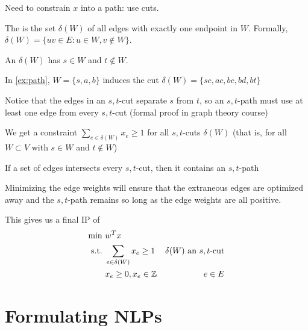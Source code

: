 Need to constrain $x$ into a path: use cuts.

\begin{defn}[cut]
  The  is the set $\delta(W)$ of all edges with exactly one endpoint in $W$.
  Formally, $\delta(W) = \{uv \in E : u \in W, v \not\in W\}$.

  An  $\delta(W)$ has $s \in W$ and $t \not\in W$.
\end{defn}
\begin{example}
  In \cref{ex:path}, $W=\{s,a,b\}$ induces the cut $\delta(W) = \{sc,ac,bc,bd,bt\}$
  \begin{center}
  \end{center}
\end{example}

\begin{prop}
  Notice that the edges in an $s,t$-cut separate $s$ from $t$, so an $s,t$-path must use at least one edge from every $s,t$-cut (formal proof in graph theory course)
\end{prop}

We get a constraint $\sum_{e \in \delta(W)} x_e \geq 1$ for all $s,t$-cuts $\delta(W)$ (that is, for all $W \subset V$ with $s \in W$ and $t\not\in W$)

\begin{prop}
  If a set of edges intersects every $s,t$-cut, then it contains an $s,t$-path
\end{prop}

Minimizing the edge weights will ensure that the extraneous edges are optimized away and the $s,t$-path remains so long as the edge weights are all positive.

This gives us a final IP of
\begin{align*}
  \min\         & w^T x                                                               \\
  \text{s.t.}\  & \sum_{e \in \delta(W)} x_e \geq 1 & \text{$\delta(W)$ an $s,t$-cut} \\
                & x_e \geq 0, x_e \in \mathbb{Z}            & e \in E
\end{align*}

\section{Formulating NLPs}

